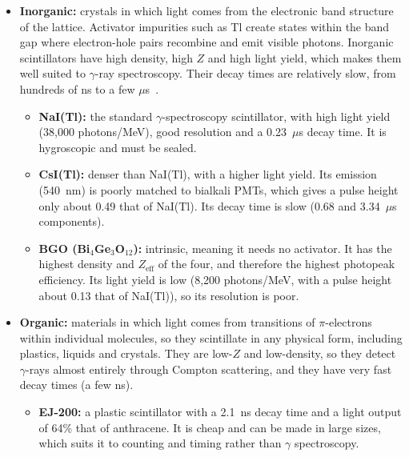 \documentclass[12pt]{article}
\begin{document}
\begin{itemize}
    \item \textbf{Inorganic:} crystals in which light comes from the electronic band structure of the lattice. Activator impurities such as Tl create states within the band gap where electron-hole pairs recombine and emit visible photons. Inorganic scintillators have high density, high $Z$ and high light yield, which makes them well suited to $\gamma$-ray spectroscopy. Their decay times are relatively slow, from hundreds of ns to a few $\mu$s~\cite{knoll}.

    \begin{itemize}
        \item \textbf{NaI(Tl):} the standard $\gamma$-spectroscopy scintillator, with high light yield (38,000 photons/MeV), good resolution and a 0.23~$\mu$s decay time. It is hygroscopic and must be sealed.
        \item \textbf{CsI(Tl):} denser than NaI(Tl), with a higher light yield. Its emission (540~nm) is poorly matched to bialkali PMTs, which gives a pulse height only about 0.49 that of NaI(Tl). Its decay time is slow (0.68 and 3.34~$\mu$s components).
        \item \textbf{BGO (Bi$_4$Ge$_3$O$_{12}$):} intrinsic, meaning it needs no activator. It has the highest density and $Z_{\mathrm{eff}}$ of the four, and therefore the highest photopeak efficiency. Its light yield is low (8,200 photons/MeV, with a pulse height about 0.13 that of NaI(Tl)), so its resolution is poor.
    \end{itemize}

    \item \textbf{Organic:} materials in which light comes from transitions of $\pi$-electrons within individual molecules, so they scintillate in any physical form, including plastics, liquids and crystals. They are low-$Z$ and low-density, so they detect $\gamma$-rays almost entirely through Compton scattering, and they have very fast decay times (a few ns).

    \begin{itemize}
        \item \textbf{EJ-200:} a plastic scintillator with a 2.1~ns decay time and a light output of 64\% that of anthracene. It is cheap and can be made in large sizes, which suits it to counting and timing rather than $\gamma$ spectroscopy.
    \end{itemize}
\end{itemize} \cite{knoll}
\end{document}
